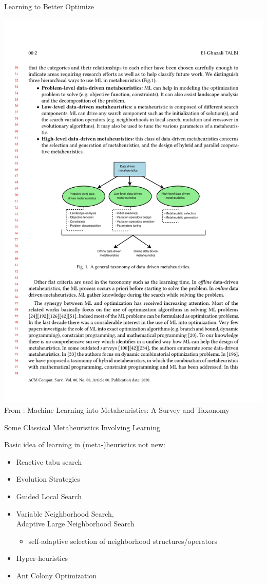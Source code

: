 \documentclass[aspectratio=1610]{beamer}
\newcommand{\important}[1]{{\color{green!60!black}#1}}
\renewcommand{\footnotesize}{\scriptsize}
\begin{document}
\begin{frame}{Learning to Better Optimize}
	\begin{center}
		\includegraphics[width=0.80\linewidth]{figures/talbi-data-driven-mhs}\\[2ex]
    \footnotesize{From \citet{talbi-21}: Machine Learning into Metaheuristics: A Survey and Taxonomy}
	\end{center}
\end{frame}


\begin{frame}{Some Classical Metaheuristics Involving Learning}

  \important{Basic idea of learning in (meta-)heuristics not new:}

  \bigskip
  \begin{itemize}
  \itemsep2.5ex
	
	\item Reactive tabu search
	\item Evolution Strategies
	\item Guided Local Search 
	\item Variable Neighborhood Search, \\
	Adaptive Large Neighborhood Search
	\begin{itemize}
		\item self-adaptive selection of neighborhood structures/operators
	\end{itemize}
	\item Hyper-heuristics
	\item Ant Colony Optimization
  \end{itemize}
\end{frame}
\end{document}
